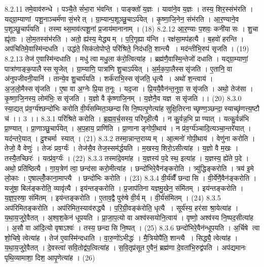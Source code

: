8.2.11
तमे॒वाव॑रुन्धे । पञ्चै॒ते सं॑भा॒रा भ॑वन्ति । पाङ्क्तो॑ य॒ज्ञः । यावा॑ने॒व य॒ज्ञः । तस्य॒ शिर॒स्संभ॑रति । यद्ग्रा॒म्याणां पशू॒नाञ्चर्म॑णा सं॒भरेत् । ग्रा॒म्यान्प॒शूञ्छु॒चाऽर्प॑येत् । कृ॒ष्णा॒जि॒नेन॒ संभ॑रति । आ॒र॒ण्याने॒व प॒शूञ्छु॒चार्प॑यति । तस्माथ्स॒माव॑त्पशू॒नां प्र॒जाय॑मानानाम् । (18)
8.2.12
आ॒र॒ण्याः प॒शवः॒ कनी॑यासः । शु॒चा ह्यृ॑ताः । लो॒म॒तस्संभ॑रति । अतो॒ ह्य॑स्य॒ मेद्ध्यम् । प॒रि॒गृह्या य॑न्ति । रक्ष॑सा॒मप॑हत्यै । ब॒हवो॑ हरन्ति । अप॑चितिमे॒वास्मि॑न्दधति । उद्ध॑ते॒ सिक॑तोपोप्ते॒ परि॑श्रिते॒ निद॑धति॒ शान्त्यै । मद॑न्तीभि॒रुप॑ सृजति । (19)
8.2.13
तेज॑ ए॒वास्मि॑न्दधाति । मधु॑ त्वा मधु॒ला क॑रो॒त्वित्या॑ह । ब्रह्म॑णै॒वास्मि॒न्तेजो॑ दधाति । यद्ग्रा॒म्याणां॒ पात्रा॑णाङ्क॒पालैस्ससृ॒जेत् । ग्रा॒म्याणि॒ पात्रा॑णि शु॒चाऽर्प॑येत् । अ॒र्म॒क॒पा॒लैस्ससृ॑जति । ए॒तानि॒ वा अ॑नुपजीवनी॒यानि॑ । तान्ये॒व शु॒चार्प॑यति । शर्क॑राभि॒स्ससृ॑जति॒ धृत्यै । अथो॑ श॒न्त्वाय॑ । अ॒ज॒लो॒मैस्ससृ॑जति । ए॒षा वा अ॒ग्नेः प्रि॒या त॒नूः । यद॒जा । प्रि॒ययै॒वैन॑न्त॒नुवा॒ ससृ॑जति । अथो॒ तेज॑सा । कृ॒ष्णा॒जि॒नस्य॒ लोम॑भिः॒ ससृ॑जति । य॒ज्ञो वै कृ॑ष्णाजि॒नम् । य॒ज्ञेनै॒व यज्ञ ससृ॑जति ।। (20)
8.3.0
स्या॒द्यत् प्र॑व॒र्ग्य॑श्छन्दो॑भिः करोति वी॒र्य॑सम्मित॒ञ्छन्दा॑सि नि॒ष्पत्पृ॒णेत्या॑ह सुक्षि॒तिरनाच्छृण्ण॒ञ्छन्दा॒॒स्याच्छृ॑णत्त्य॒ष्टौ च॑ ।। 3 ।।
8.3.1
परि॑श्रिते करोति । ब्र॒ह्म॒व॒र्च॒सस्य॒ परि॑गृहीत्यै । न कु॒र्वन्न॒भि प्राण्यात् । यत्कु॒र्वन्न॑भि प्रा॒ण्यात् । प्रा॒णाञ्छु॒चार्प॑येत् । अ॒प॒हाय॒ प्राणि॑ति । प्रा॒णानाङ्गोपी॒थाय॑ । न प्र॑व॒र्ग्य॑ञ्चादि॒त्यञ्चा॒न्तरे॑यात् । यद॑न्तरे॒यात् । दु॒श्चर्मा स्यात् । (21)
8.3.2
तस्मा॒न्नान्त॒राय्यम् । आ॒त्मनो॑ गोपी॒थाय॑ । वेणु॑ना करोति । तेजो॒ वै वेणुः॑ । तेजः॑ प्रव॒र्ग्यः॑ । तेज॑सै॒व तेज॒स्सम॑र्द्धयति । म॒खस्य॒ शिरो॒ऽसीत्या॑ह । य॒ज्ञो वै म॒खः । तस्यै॒तच्छिरः॑ । यत्प्र॑व॒र्ग्यः॑ । (22)
8.3.3
तस्मा॑दे॒वमा॑ह । य॒ज्ञस्य॑ प॒दे स्थ॒ इत्या॑ह । य॒ज्ञस्य॒ ह्ये॑ते प॒दे । अथो॒ प्रति॑ष्ठित्यै । गा॒य॒त्रेण॑ त्वा॒ छन्द॑सा करो॒मीत्या॑ह । छन्दो॑भिरे॒वैन॑ङ्करोति । त्र्यु॑द्धिङ्करोति । त्रय॑ इ॒मे लो॒काः । ए॒षाल्लोँ॒काना॒माप्त्यै । छन्दो॑भिः करोति । (23)
8.3.4
वी॒र्य॑व्वैँ छन्दा॑सि । वी॒र्ये॑णै॒वैन॑ङ्करोति । यजु॑षा॒ बिल॑ङ्करोति॒ व्यावृ॑त्यै । इय॑न्तङ्करोति । प्र॒जाप॑तिना यज्ञमु॒खेन॒ संमि॑तम् । इय॑न्तङ्करोति । य॒ज्ञ॒प॒रुषा॒ संमि॑तम् । इय॑न्तङ्करोति । ए॒ताव॒द्वै पुरु॑षे वी॒र्यम् । वी॒र्य॑संमितम् । (24)
8.3.5
अप॑रिमितङ्करोति । अप॑रिमित॒स्याव॑रुद्ध्यै । प॒रि॒ग्री॒वङ्क॑रोति॒ धृत्यै । सूर्य॑स्य॒ हर॑सा श्रा॒येत्या॑ह । य॒था॒य॒जुरे॒वैतत् । अ॒श्व॒श॒केन॑ धूपयति । प्रा॒जा॒प॒त्यो वा अश्व॑स्सयोनि॒त्वाय॑ । वृष्णो॒ अश्व॑स्य नि॒ष्पद॒सीत्या॑ह । अ॒सौ वा आ॑दि॒त्यो वृषाऽश्वः॑ । तस्य॒ छन्दा॑सि नि॒ष्पत् । (25)
8.3.6
छन्दो॑भिरे॒वैन॑न्धूपयति । अ॒र्चिषे त्वा शो॒चिषे॒ त्वेत्या॑ह । तेज॑ ए॒वास्मि॑न्दधाति । वा॒रु॒णो॑ऽभीद्धः॑ । मै॒त्रियोपै॑ति॒ शान्त्यै । सिद्ध्यै॒ त्वेत्या॑ह । य॒था॒य॒जुरे॒वैतत् । दे॒वस्त्वा॑ सवि॒तोद्व॑प॒त्वित्या॑ह । स॒वि॒तृप्र॑सूत ए॒वैनं॒ ब्रह्म॑णा दे॒वता॑भि॒रुद्व॑पति । अप॑द्यमानः पृथि॒व्यामाशा॒ दिश॒ आपृ॒णेत्या॑ह । (26)
